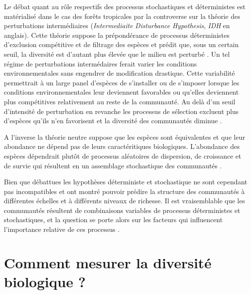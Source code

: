 \documentclass[
  11pt,
  french,
  A4paper,
  extrafontsizes,onecolumn,openright
  ]{memoir}
\begin{document}
Le débat quant au rôle respectifs des processus stochastiques et
déterministes est matérialisé dans le cas des forêts tropicales par la
controverse sur la théorie des perturbations intermédiaires
(\emph{Intermediaite Disturbance Hypothesis}, \emph{IDH} en anglais).
Cette théorie suppose la prépondérance de processus déterministes
d'exclusion compétitive et de filtrage des espèces et prédit que, sous
un certain seuil, la diversité est d'autant plus élevée que le milieu
est perturbé \autocite{Molino2001}. Un tel régime de perturbations
intermédaires ferait varier les conditions environnementales sans
engendrer de modification drastique. Cette variabilité permettrait à un
large panel d'espèces de s'installer ou de s'imposer lorsque les
conditions environnementales leur deviennent favorables ou qu'elles
deviennent plus compétitives relativement au reste de la communauté. Au
delà d'un seuil d'intensité de perturbation en revanche les processus de
sélection excluent plus d'espèces qu'ils n'en favorisent et la diversité
des communautés diminue
\autocites{Chesson2000}{Kariuki2006a}{Berry2008a}.

A l'inverse la théorie neutre suppose que les espèces sont équivalentes
et que leur abondance ne dépend pas de leurs caractéritiques
biologiques. L'abondance des espèces dépendrait plutôt de processus
aléatoires de dispersion, de croissance et de survie qui résultent en un
assemblage stochastique des communautés \autocite{Hubbell2001}.

Bien que débattues les hypothèses déterministe et stochastique ne sont
cependant pas incompatibles et ont montré pouvoir prédire la structure
des communautés à différentes échelles et à différents niveaux de
richesse. Il est vraisemblable que les communautés résultent de
combinaisons variables de processus déterministes et stochastiques, et
la question se porte alors sur les facteurs qui influencent l'importance
relative de ces processus \autocite{Chave2004}.

\section{Comment mesurer la diversité biologique
?}\label{comment-mesurer-la-diversite-biologique}
\end{document}
